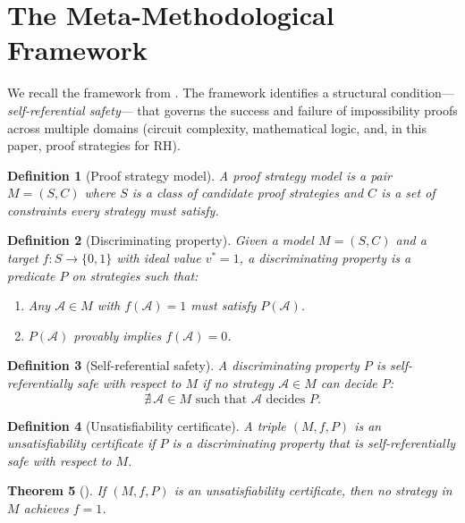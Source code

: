 \documentclass[12pt]{article}
\newtheorem{theorem}{Theorem}[section]
\newtheorem{definition}[theorem]{Definition}
\begin{document}
\section{The Meta-Methodological Framework}
\label{sec:framework}

We recall the framework from \cite{metamethod2026}. The framework
identifies a structural condition---\emph{self-referential safety}---
that governs the success and failure of impossibility proofs across
multiple domains (circuit complexity, mathematical logic, and, in this
paper, proof strategies for RH).

\begin{definition}[Proof strategy model]
A \emph{proof strategy model} is a pair $M = (S, C)$ where $S$ is a
class of candidate proof strategies and $C$ is a set of constraints
every strategy must satisfy.
\end{definition}

\begin{definition}[Discriminating property]
\label{def:discrim}
Given a model $M = (S,C)$ and a target $f: S \to \{0,1\}$ with ideal
value $v^* = 1$, a \emph{discriminating property} is a predicate $P$
on strategies such that:
\begin{enumerate}
\item[\textup{(Necessity)}] Any $\mathcal{A} \in M$ with
  $f(\mathcal{A}) = 1$ must satisfy $P(\mathcal{A})$.
\item[\textup{(Conflict)}] $P(\mathcal{A})$ provably implies
  $f(\mathcal{A}) = 0$.
\end{enumerate}
\end{definition}

\begin{definition}[Self-referential safety]
\label{def:safety}
A discriminating property $P$ is \emph{self-referentially safe} with
respect to $M$ if no strategy $\mathcal{A} \in M$ can decide $P$:
\[
\nexists\, \mathcal{A} \in M \text{ such that } \mathcal{A}
\text{ decides } P.
\]
\end{definition}

\begin{definition}[Unsatisfiability certificate]
A triple $(M, f, P)$ is an \emph{unsatisfiability certificate} if $P$
is a discriminating property that is self-referentially safe with
respect to $M$.
\end{definition}

\begin{theorem}[{\cite[Theorem~2.6]{metamethod2026}}]
\label{thm:framework}
If $(M, f, P)$ is an unsatisfiability certificate, then no strategy
in $M$ achieves $f = 1$.
\end{theorem}
\end{document}
